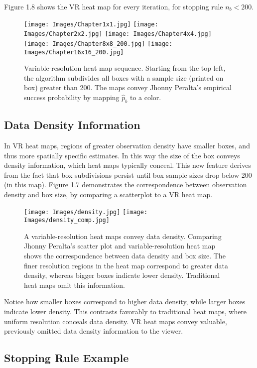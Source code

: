 Figure 1.8 shows the VR heat map for every iteration, for stopping rule $n_{b} < 200$.
        \begin{figure}[H]
      	\centering
      	\texttt{[image: Images/Chapter1x1.jpg]}
      	\texttt{[image: Images/Chapter2x2.jpg]}
      	\texttt{[image: Images/Chapter4x4.jpg]}
      	\texttt{[image: Images/Chapter8x8\_200.jpg]} 
      	\texttt{[image: Images/Chapter16x16\_200.jpg]} 
      	\caption{Variable-resolution heat map sequence. Starting from the top left, the algorithm subdivides all boxes with a sample size (printed on box) greater than 200. The maps convey Jhonny Peralta's empirical success probability by mapping $\hat{p}_{b}$ to a color.}
      	\end{figure}
      	
\subsection{Data Density Information}

In VR heat maps, regions of greater observation density have smaller boxes, and thus more spatially specific estimates. In this way the size of the box conveys density information, which heat maps typically conceal. This new feature derives from the fact that box subdivisions persist until box sample sizes drop below 200 (in this map). Figure 1.7 demonstrates the correspondence between observation density and box size, by comparing a scatterplot to a VR heat map. 
        \begin{figure}[H]
      	\centering
      	\texttt{[image: Images/density.jpg]}
      	\texttt{[image: Images/density\_comp.jpg]} 
      	\caption{A variable-resolution heat maps convey data density. Comparing Jhonny Peralta's scatter plot and variable-resolution heat map shows the correspondence between data density and box size. The finer resolution regions in the heat map correspond to greater data density, whereas bigger boxes indicate lower density. Traditional heat maps omit this information.}
      	\end{figure}
Notice how smaller boxes correspond to higher data density, while larger boxes indicate lower density. This contrasts favorably to traditional heat maps, where uniform resolution conceals data density. VR heat maps convey valuable, previously omitted data density information to the viewer. 
      	
\subsection{Stopping Rule Example} %
      	
